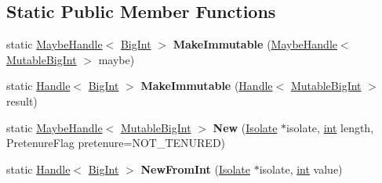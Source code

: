 \subsection*{Static Public Member Functions}
\begin{DoxyCompactItemize}
\item 
\mbox{\label{classv8_1_1internal_1_1MutableBigInt_a057d1c96953697b449e505ae2f682f5d}} 
static \mbox{\hyperlink{classv8_1_1internal_1_1MaybeHandle}{Maybe\+Handle}}$<$ \mbox{\hyperlink{classv8_1_1internal_1_1BigInt}{Big\+Int}} $>$ {\bfseries Make\+Immutable} (\mbox{\hyperlink{classv8_1_1internal_1_1MaybeHandle}{Maybe\+Handle}}$<$ \mbox{\hyperlink{classv8_1_1internal_1_1MutableBigInt}{Mutable\+Big\+Int}} $>$ maybe)
\item 
\mbox{\label{classv8_1_1internal_1_1MutableBigInt_adaee195ad51ca5705795c847847e6f93}} 
static \mbox{\hyperlink{classv8_1_1internal_1_1Handle}{Handle}}$<$ \mbox{\hyperlink{classv8_1_1internal_1_1BigInt}{Big\+Int}} $>$ {\bfseries Make\+Immutable} (\mbox{\hyperlink{classv8_1_1internal_1_1Handle}{Handle}}$<$ \mbox{\hyperlink{classv8_1_1internal_1_1MutableBigInt}{Mutable\+Big\+Int}} $>$ result)
\item 
\mbox{\label{classv8_1_1internal_1_1MutableBigInt_aaec3d6dbe48dcaa11dadcda782a63aaa}} 
static \mbox{\hyperlink{classv8_1_1internal_1_1MaybeHandle}{Maybe\+Handle}}$<$ \mbox{\hyperlink{classv8_1_1internal_1_1MutableBigInt}{Mutable\+Big\+Int}} $>$ {\bfseries New} (\mbox{\hyperlink{classv8_1_1internal_1_1Isolate}{Isolate}} $\ast$isolate, \mbox{\hyperlink{classint}{int}} length, Pretenure\+Flag pretenure=N\+O\+T\+\_\+\+T\+E\+N\+U\+R\+ED)
\item 
\mbox{\label{classv8_1_1internal_1_1MutableBigInt_a23458b4f5643e4af72b70b598e5d2534}} 
static \mbox{\hyperlink{classv8_1_1internal_1_1Handle}{Handle}}$<$ \mbox{\hyperlink{classv8_1_1internal_1_1BigInt}{Big\+Int}} $>$ {\bfseries New\+From\+Int} (\mbox{\hyperlink{classv8_1_1internal_1_1Isolate}{Isolate}} $\ast$isolate, \mbox{\hyperlink{classint}{int}} value)
\item 
\mbox{\label{classv8_1_1internal_1_1MutableBigInt_aa3c0e0a19bae913c3f593a7f8b4a2170}} 

\end{DoxyCompactItemize}
